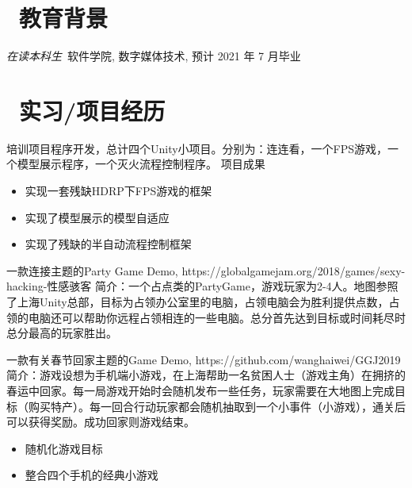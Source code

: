 \documentclass{resume}
\begin{document}


 
\section{\faGraduationCap\  教育背景}
\textit{在读本科生}\ 软件学院, 数字媒体技术, 预计 2021 年 7 月毕业

\section{\faUsers\ 实习/项目经历}
\role{企业项目实训}{游戏客户端研发}
\begin{onehalfspacing}
培训项目程序开发，总计四个Unity小项目。分别为：连连看，一个FPS游戏，一个模型展示程序，一个灭火流程控制程序。
\newline
项目成果
\begin{itemize}
  \item 实现一套残缺HDRP下FPS游戏的框架
  \item 实现了模型展示的模型自适应
  \item 实现了残缺的半自动流程控制框架
\end{itemize}
\end{onehalfspacing}

\begin{onehalfspacing}
一款连接主题的Party Game Demo, https://globalgamejam.org/2018/games/sexy-hacking-性感骇客
\newline
简介：一个占点类的PartyGame，游戏玩家为2-4人。地图参照了上海Unity总部，目标为占领办公室里的电脑，占领电脑会为胜利提供点数，占领的电脑还可以帮助你远程占领相连的一些电脑。总分首先达到目标或时间耗尽时总分最高的玩家胜出。
\end{onehalfspacing}

\begin{onehalfspacing}
一款有关春节回家主题的Game Demo, https://github.com/wanghaiwei/GGJ2019
\newline
简介：游戏设想为手机端小游戏，在上海帮助一名贫困人士（游戏主角）在拥挤的春运中回家。每一局游戏开始时会随机发布一些任务，玩家需要在大地图上完成目标（购买特产）。每一回合行动玩家都会随机抽取到一个小事件（小游戏），通关后可以获得奖励。成功回家则游戏结束。
\begin{itemize}
  \item 随机化游戏目标
  \item 整合四个手机的经典小游戏
\end{itemize}
\end{onehalfspacing}
\end{document}
